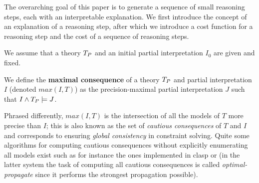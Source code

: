 
The overarching goal of this paper is to generate a sequence of small reasoning steps, each with an interpretable explanation. We first introduce the concept of an explanation of a reasoning step, after which we introduce a cost function for a reasoning step and the cost of a sequence of reasoning steps. 

We assume that a theory $T_P$ and an initial partial interpretation $I_0$ are given and fixed. 

\begin{definition}
We define the \textbf{maximal consequence} of a theory $T_P$ and partial interpretation $I$ (denoted $max(I,T)$) as the precision-maximal partial interpretation $J$ such that  $I \wedge T_P \models J$. 
\end{definition}
Phrased differently, $max(I,T)$ is the intersection of all the models of $T$ more precise than $I$; this is also known as the set of \emph{cautious consequences} of $T$ and $I$ and corresponds to ensuring \emph{global consistency} in constraint solving. 
Quite some algorithms for computing cautious consequences without explicitly enumerating all models exist such as for instance the ones implemented in clasp \cite{DBLP:conf/lpnmr/GebserKS09} or \idp \cite{de2018predicate} (in the latter system the task of computing all cautious consequences is called \emph{optimal-propagate} since it performs the strongest propagation possible). 

